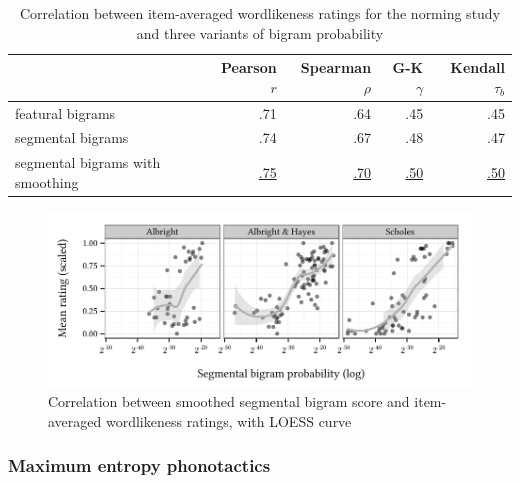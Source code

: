 \begin{table}[t]
\centering
\begin{tabular}{l rrrr}
\toprule
                                 & Pearson $r$ & Spearman $\rho$ & G-K $\gamma$ & Kendall $\tau_{b}$ \\
\midrule
featural  bigrams                &       {.71} &       {.64}     &       {.45}  &       {.45} \\
segmental bigrams                &       {.74} &       {.67}     &       {.48}  &       {.47} \\
segmental bigrams with smoothing & \uline{.75} & \uline{.70}     & \uline{.50}  & \uline{.50} \\
\bottomrule
\end{tabular}
\caption{Correlation between item-averaged wordlikeness ratings for the \citet{Albright2003b} norming study and three variants of bigram probability}
\label{bigramcomparison}
\end{table}

\begin{figure}[t]
\centering
\includegraphics{bigram.pdf}
\caption{Correlation between smoothed segmental bigram score and item-averaged wordlikeness ratings, with LOESS curve}
\label{bigram}
\end{figure}

\subsubsection{Maximum entropy phonotactics}

